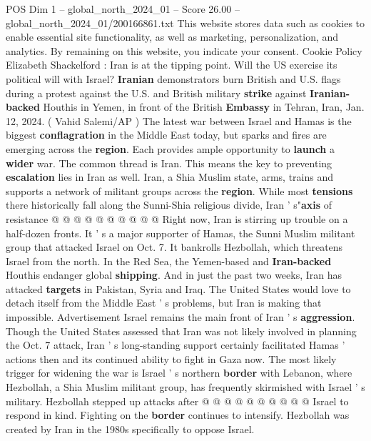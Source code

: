 \begin{textsample}{POS Dim 1 – global\_north\_2024\_01 – Score 26.00 – global\_north\_2024\_01/200166861.txt}  \label{ex:f1_pos_128}
This website stores data such as cookies to enable essential site functionality, as well as marketing, personalization, and analytics.
By remaining on this website, you indicate your consent.
Cookie Policy Elizabeth Shackelford : Iran is at the tipping point.
Will the US exercise its political will with Israel? \textbf{Iranian} demonstrators burn British and U.S. flags during a protest against the U.S. and British military \textbf{strike} against \textbf{Iranian-backed} Houthis in Yemen, in front of the British \textbf{Embassy} in Tehran, Iran, Jan. 12, 2024. ( Vahid Salemi/AP ) The latest war between Israel and Hamas is the biggest \textbf{conflagration} in the Middle East today, but sparks and fires are emerging across the \textbf{region}.
Each provides ample opportunity to \textbf{launch} a \textbf{wider} war.
The common thread is Iran.
This means the key to preventing \textbf{escalation} lies in Iran as well.
Iran, a Shia Muslim state, arms, trains and supports a network of militant groups across the \textbf{region}.
While most \textbf{tensions} there historically fall along the Sunni-Shia religious divide, Iran ' s"\textbf{axis} of resistance @ @ @ @ @ @ @ @ @ @ Right now, Iran is stirring up trouble on a half-dozen fronts.
It ' s a major supporter of Hamas, the Sunni Muslim militant group that attacked Israel on Oct. 7.
It bankrolls Hezbollah, which threatens Israel from the north.
In the Red Sea, the Yemen-based and \textbf{Iran-backed} Houthis endanger global \textbf{shipping}.
And in just the past two weeks, Iran has attacked \textbf{targets} in Pakistan, Syria and Iraq.
The United States would love to detach itself from the Middle East ' s problems, but Iran is making that impossible.
Advertisement Israel remains the main front of Iran ' s \textbf{aggression}.
Though the United States assessed that Iran was not likely involved in planning the Oct. 7 attack, Iran ' s long-standing support certainly facilitated Hamas ' actions then and its continued ability to fight in Gaza now.
The most likely trigger for widening the war is Israel ' s northern \textbf{border} with Lebanon, where Hezbollah, a Shia Muslim militant group, has frequently skirmished with Israel ' s military.
Hezbollah stepped up attacks after @ @ @ @ @ @ @ @ @ @ Israel to respond in kind.
Fighting on the \textbf{border} continues to intensify.
Hezbollah was created by Iran in the 1980s specifically to oppose Israel.

\end{textsample}
